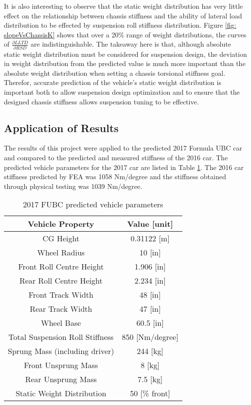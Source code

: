 \documentclass[a4paper]{article}
\numberwithin{equation}{section}
\begin{document}
It is also interesting to observe that the static weight distribution has very little effect on the relationship between chassis stiffness and the ability of lateral load distribution to be effected by suspension roll stiffness distribution. Figure \ref{fig: slopeVsChassisK} shows that over a 20\% range of weight distributions, the curves of $\frac{\partial LLTD}{\partial RSD}$ are indistinguishable. The takeaway here is that, although absolute static weight distribution must be considered for suspension design, the deviation in weight distribution from the predicted value is much more important than the absolute weight distribution when setting a chassis torsional stiffness goal. Therefor, accurate prediction of the vehicle's static weight distribution is important both to allow suspension design optimization and to ensure that the designed chassis stiffness allows suspension tuning to be effective.
 
\subsection{Application of Results}
The results of this project were applied to the predicted 2017 Formula UBC car and compared to the predicted and measured stiffness of the 2016 car. The predicted vehicle parameters for the 2017 car are listed in Table \ref{table: 2017Car}. The 2016 car stiffness predicted by FEA was 1058 Nm/degree and the stiffness obtained through physical testing was 1039 Nm/degree.

\begin{table}[H]
	\begin{center}
		\begin{tabular}{|c|c|}
			\hline
			Vehicle Property & Value [unit]\\
			\hline
			CG Height & 0.31122 [m]\\
			\hline
			Wheel Radius & 10 [in]\\
			\hline
			Front Roll Centre Height & 1.906 [in]\\
			\hline
			Rear Roll Centre Height & 2.234 [in]\\
			\hline
			Front Track Width & 48 [in]\\
			\hline
			Rear Track Width & 47 [in]\\
			\hline
			Wheel Base & 60.5 [in]\\
			\hline
			Total Suspension Roll Stiffness & 850 [Nm/degree]\\
			\hline
			Sprung Mass (including driver) & 244 [kg]\\
			\hline
			Front Unsprung Mass & 8 [kg]\\
			\hline
			Rear Unsprung Mass & 7.5 [kg]\\
			\hline
			Static Weight Distribution & 50 [\% front]\\
			\hline
		\end{tabular}
		\caption{2017 FUBC predicted vehicle parameters}
		\label{table: 2017Car}
	\end{center}
\end{table}
\end{document}
